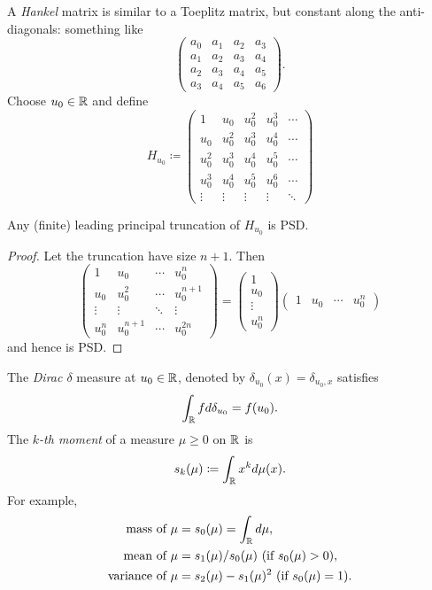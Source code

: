 \begin{examples}
    \item A \emph{Hankel} matrix is similar to a Toeplitz matrix, but
    constant along the anti-diagonals: something like \[
        \begin{pmatrix}
            a_0 & a_1 & a_2 & a_3 \\
            a_1 & a_2 & a_3 & a_4 \\
            a_2 & a_3 & a_4 & a_5 \\
            a_3 & a_4 & a_5 & a_6
        \end{pmatrix}.
    \] Choose $u_0 \in \mathbb{R}$ and define \[
        H_{u_0} \coloneq \begin{pmatrix}
            1 & u_0 & u_0^2 & u_0^3 & \cdots \\
            u_0 & u_0^2 & u_0^3 & u_0^4 & \cdots \\
            u_0^2 & u_0^3 & u_0^4 & u_0^5 & \cdots \\
            u_0^3 & u_0^4 & u_0^5 & u_0^6 & \cdots \\
            \vdots & \vdots & \vdots & \vdots & \ddots
        \end{pmatrix}
    \]
    \begin{claim}
        Any (finite) leading principal truncation of $H_{u_0}$ is PSD.
    \end{claim}
    \begin{proof}
        Let the truncation have size $n + 1$.
        Then \[
            \begin{pmatrix}
                1 & u_0 & \cdots & u_0^n \\
                u_0 & u_0^2 & \cdots & u_0^{n+1} \\
                \vdots & \vdots & \ddots & \vdots \\
                u_0^n & u_0^{n+1} & \cdots & u_0^{2n}
            \end{pmatrix} = \begin{pmatrix}
                1 \\
                u_0 \\
                \vdots \\
                u_0^n
            \end{pmatrix} \begin{pmatrix}
                1 & u_0 & \cdots & u_0^n
            \end{pmatrix}
        \] and hence is PSD.
    \end{proof}

    The \emph{Dirac $\delta$} measure at $u_0 \in \mathbb{R}$, denoted by
    $\delta_{u_0}(x) = \delta_{u_0,x}$ satisfies \[
        \int_{\mathbb{R}} f d\delta_{u_0} = f(u_0).
    \]
    The \emph{$k$-th moment} of a measure $\mu \ge 0$ on $\mathbb{R}$ is \[
        s_k(\mu) \coloneq \int_{\mathbb{R}} x^k d\mu(x).
    \] For example, \begin{align*}
        \text{mass of } \mu &= s_0(\mu) = \int_{\mathbb{R}} d\mu, \\
        \text{mean of } \mu &= s_1(\mu) / s_0(\mu) \text{ (if $s_0(\mu) > 0$)}, \\
        \text{variance of } \mu &= s_2(\mu) - s_1(\mu)^2 \text{ (if $s_0(\mu) = 1$)}.
    \end{align*}
\end{examples}
